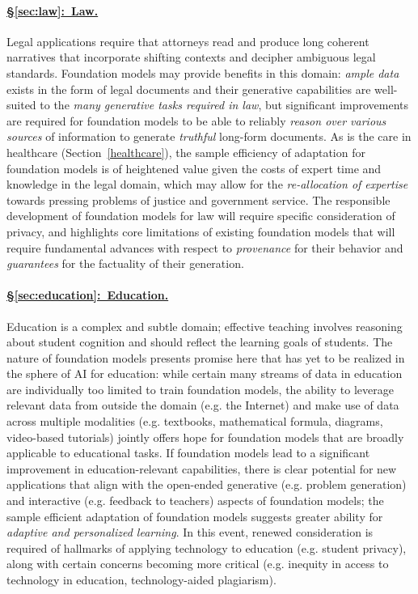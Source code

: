 \paragraph{\hyperref[sec:law]{§\ref{sec:law}:~Law.}}

Legal applications require that attorneys read and produce long coherent narratives that incorporate shifting contexts and decipher ambiguous legal standards. Foundation models may provide benefits in this domain: \textit{ample data} exists in the form of legal documents and their generative capabilities are well-suited to the \textit{many generative tasks required in law}, but significant improvements are required for foundation models to be able to reliably \textit{reason over various sources} of information to generate \textit{truthful} long-form documents. As is the care in healthcare (Section~\ref{healthcare}), the sample efficiency of adaptation for foundation models is of heightened value given the costs of expert time and knowledge in the legal domain, which may allow for the \textit{re-allocation of expertise} towards pressing problems of justice and government service. The responsible development of foundation models for law will require specific consideration of privacy, and highlights core limitations of existing foundation models that will require fundamental advances with respect to \textit{provenance} for their behavior and \textit{guarantees} for the factuality of their generation.

\paragraph{\hyperref[sec:education]{§\ref{sec:education}:~Education.}} 

Education is a complex and subtle domain; effective teaching involves reasoning about student cognition and should reflect the learning goals of students. The nature of foundation models presents promise here that has yet to be realized in the sphere of AI for education: while certain many streams of data in education are individually too limited to train foundation models, the ability to leverage relevant data from outside the domain (e.g. the Internet) and make use of data across multiple modalities (e.g. textbooks, mathematical formula, diagrams, video-based tutorials) jointly offers hope for foundation models that are broadly applicable to educational tasks. If foundation models lead to a significant improvement in education-relevant capabilities, there is clear potential for new applications that align with the open-ended generative (e.g. problem generation) and interactive (e.g. feedback to teachers) aspects of foundation models; the sample efficient adaptation of foundation models suggests greater ability for \textit{adaptive and personalized learning}. In this event, renewed consideration is required of hallmarks of applying technology to education (e.g. student privacy), along with certain concerns becoming more critical (e.g. inequity in access to technology in education, technology-aided plagiarism).

